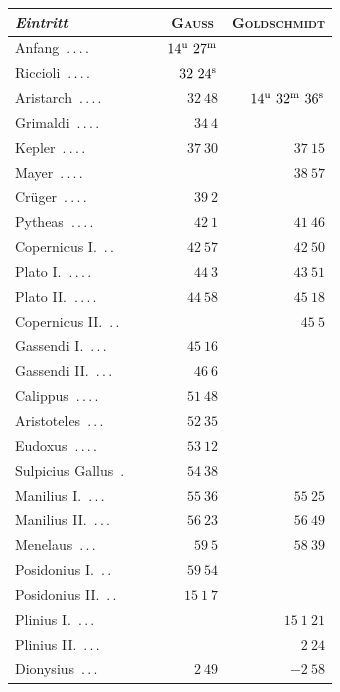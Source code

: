 \begin{center}\begingroup\fontsize{10}{12}\selectfont\setlength{\tabcolsep}{5pt}
\begin{tabular}{@{}p{0.47\linewidth}|r|r@{}}
\emph{Eintritt} & \multicolumn{1}{c|}{\textsc{Gauss}} & \multicolumn{1}{c}{\textsc{Goldschmidt}}\\\hline
Anfang\ \mbox{.\,.\,.\,.} & $14^{\rm u}\ 27^{\rm m}$ & \\
Riccioli\ \mbox{.\,.\,.\,.} & $32\ 24^{\rm s}$ & \\
Aristarch\ \mbox{.\,.\,.\,.} & $32\ 48$ & $14^{\rm u}\ 32^{\rm m}\ 36^{\rm s}$\\
Grimaldi\ \mbox{.\,.\,.\,.} & $34\ 4$ & \\
Kepler\ \mbox{.\,.\,.\,.} & $37\ 30$ & $37\ 15$\\
Mayer\ \mbox{.\,.\,.\,.} &  & $38\ 57$\\
Crüger\ \mbox{.\,.\,.\,.} & $39\ 2$ & \\
Pytheas\ \mbox{.\,.\,.\,.} & $42\ 1$ & $41\ 46$\\
Copernicus I.\ \mbox{.\,.} & $42\ 57$ & $42\ 50$\\
Plato I.\ \mbox{.\,.\,.\,.} & $44\ 3$ & $43\ 51$\\
Plato II.\ \mbox{.\,.\,.\,.} & $44\ 58$ & $45\ 18$\\
Copernicus II.\ \mbox{.\,.} &  & $45\ 5$\\
Gassendi I.\ \mbox{.\,.\,.} & $45\ 16$ & \\
Gassendi II.\ \mbox{.\,.\,.} & $46\ 6$ & \\
Calippus\ \mbox{.\,.\,.\,.} & $51\ 48$ & \\
Aristoteles\ \mbox{.\,.\,.} & $52\ 35$ & \\
Eudoxus\ \mbox{.\,.\,.\,.} & $53\ 12$ & \\
Sulpicius Gallus\ \mbox{.} & $54\ 38$ & \\
Manilius I.\ \mbox{.\,.\,.} & $55\ 36$ & $55\ 25$\\
Manilius II.\ \mbox{.\,.\,.} & $56\ 23$ & $56\ 49$\\
Menelaus\ \mbox{.\,.\,.} & $59\ 5$ & $58\ 39$\\
Posidonius I.\ \mbox{.\,.} & $59\ 54$ & \\
Posidonius II.\ \mbox{.\,.} & $15\ 1\ 7$ & \\
Plinius I.\ \mbox{.\,.\,.} &  & $15\ 1\ 21$\\
Plinius II.\ \mbox{.\,.\,.} &  & $2\ 24$\\
Dionysius\ \mbox{.\,.\,.} & $2\ 49$ & $-2\ 58$\\

\end{tabular}
\end{center}
